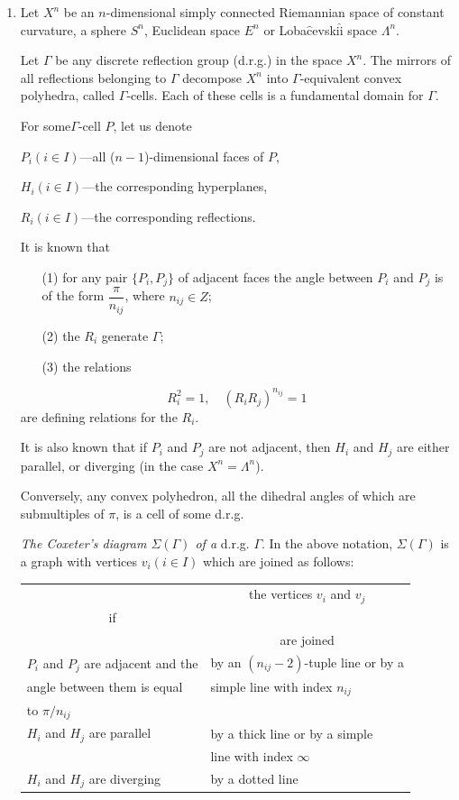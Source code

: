 \begin{enumerate}
\item Let $X^n$ be an $n$-dimensional simply connected Riemannian space of constant curvature, \ie a sphere $S^n$, Euclidean space $E^n$ or Loba$\hat{\text{c}}$evski$\hat{\text{i}}$ space $\Lambda^n$.

Let $\Gamma$ be any discrete reflection group (d.r.g.) in the space $X^n$. The mirrors of all reflections belonging to $\Gamma$ decompose $X^n$ into $\Gamma$-equivalent convex polyhedra, called $\Gamma$-cells. Each of these cells is a fundamental domain for $\Gamma$.
 
For some\pageoriginale $\Gamma$-cell $P$, let us denote

$P_i (i \in I)$---all ($n-1$)-dimensional faces of $P$,

$H_i(i \in I)$---the corresponding hyperplanes,

$R_i(i \in I)$---the corresponding reflections.

It is known that 
\begin{itemize}
\item[(1)] for any pair $\{P_i, P_j\}$ of adjacent faces the angle between $P_i$ and $P_j$ is of the form $\dfrac{\pi}{n_{ij}}$, where $n_{ij} \in Z$;

\item[(2)] the $R_i$ generate $\Gamma$;

\item[(3)] the relations 
\end{itemize}
$$
R^2_i = 1, \quad (R_i R_j)^{n_{ij}} =1
$$
are defining relations for the $R_i$.

It is also known \cite{art10-key9, art10-key10} that if $P_i$ and $P_j$ are not adjacent, then $H_i$ and $H_j$ are either parallel, or diverging (in the case $X^n = \Lambda^n$).

Conversely, any convex polyhedron, all the dihedral angles of which are submultiples of $\pi$, is a cell of some d.r.g.

\textit{The Coxeter's diagram $\Sigma (\Gamma)$ of a} d.r.g. $\Gamma$. In the above notation, $\Sigma (\Gamma)$ is a graph with vertices $v_i (i \in I)$ which are joined as follows:
{
\tabcolsep=3pt
\setcounter{table}{0}
\begin{longtable}{@{}l|l@{}}
\hline
&  \multicolumn{1}{c}{the vertices $v_i$ and $v_j$} \\[-0.4cm]
\multicolumn{1}{c|}{if} & \\
& \multicolumn{1}{c}{are joined} \\\hline
$P_i$ and $P_j$ are adjacent and the & by an $(n_{ij}-2)$-tuple line or by a \\
angle between them is equal  & simple line with index $n_{ij}$\\
to $\pi / n_{ij}$ & \\\hline
$H_i$ and $H_j$ are parallel & by a thick line or by a simple\\
& line with index $\infty$\\\hline
$H_i$ and $H_j$ are diverging & by a dotted line\\\hline
\end{longtable}}\relax


\end{enumerate}
